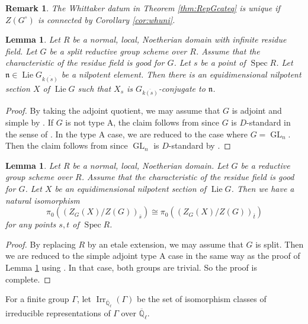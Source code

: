 \documentclass[12pt,a4paper]{article}
\newtheorem{lem}[thm]{Lemma}
\newtheorem{rem}[thm]{Remark}
\DeclareMathOperator{\Spec}{Spec}
\DeclareMathOperator{\Irr}{Irr}
\DeclareMathOperator{\Lie}{Lie}
\DeclareMathOperator{\GL}{GL}
\newcommand{\mb}{\mathbb}
\newcommand{\mf}{\mathfrak}
\newcommand{\ol}{\overline}
\begin{document}
\begin{rem}
The Whittaker datum in Theorem \ref{thm:RepGcateq} is unique if $Z(G^{\circ})$ is connected by Corollary \ref{cor:whuni}. 
\end{rem}


\begin{lem}\label{lem:edlift}
Let $R$ be a normal, local, Noetherian domain with infinite residue field. 
Let $G$ be a split reductive group scheme over $R$. 
Assume that the characteristic of the residue field is good for $G$. 
Let $s$ be a point of $\Spec R$. 
Let $\mf{n} \in \Lie G_{\ol{k(s)}}$ be a nilpotent element. 
Then there is an equidimensional nilpotent section $X$ of $\Lie G$ such that 
$X_s$ is $G_{\ol{k(s)}}$-conjugate to $\mf{n}$. 
\end{lem}
\begin{proof}
By taking the adjoint quotient, we may assume that $G$ is 
adjoint and simple by \cite[XXIV, Proposition 5.10]{SGA3-3}. If $G$ is not type A, the claim follows from 
\cite[5.4 Theorem]{McNCentnilp} since $G$ is $D$-standard in the sense of \cite[3.9]{McNCentnilp}. In the type A case, we are reduced to the case where $G=\GL_n$. Then the claim follows from \cite[5.4 Theorem]{McNCentnilp} since $\GL_n$ is $D$-standard by \cite[(3.9.3)]{McNCentnilp}. 
\end{proof}

\begin{lem}\label{lem:Aiso}
Let $R$ be a normal, local, Noetherian domain. 
Let $G$ be a reductive group scheme over $R$. 
Assume that the characteristic of the residue field is good for $G$. 
Let $X$ be an equidimensional nilpotent section of $\Lie G$. 
Then we have a natural isomorphism 
\begin{equation*}
 \pi_0( (Z_G(X)/Z(G))_{\ol{s}}) \cong \pi_0( (Z_G(X)/Z(G))_{\ol{t}}) 
\end{equation*}
for any points $s,t$ of $\Spec R$. 
\end{lem}
\begin{proof}
By replacing $R$ by an etale extension, we may assume that $G$ is split. Then we are reduced to the simple adjoint type A case in the same way as the proof of Lemma \ref{lem:edlift} using \cite[7.2 Theorem]{McNCentnilp}. In that case, both groups are trivial. So the proof is complete. 
\end{proof}

For a finite group $\Gamma$, 
let $\Irr_{\ol{\mb{Q}}_{\ell}}(\Gamma)$ 
be the set of isomorphism classes of 
irreducible representations of $\Gamma$ 
over $\ol{\mb{Q}}_{\ell}$. 
\end{document}
